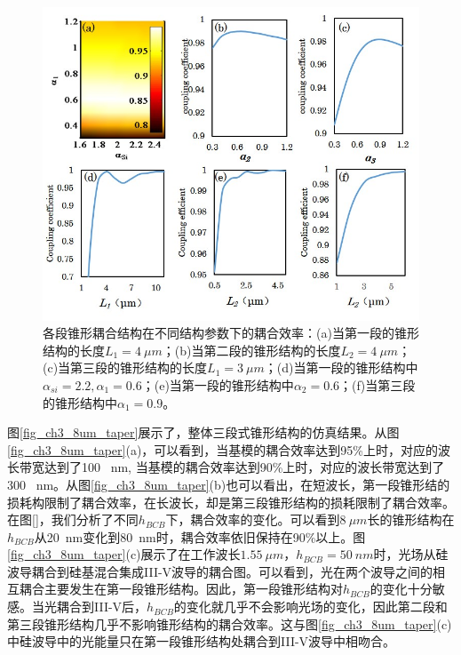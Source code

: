 \begin{figure}[htb]
	\centering
	\includegraphics[width=14cm]{./Pictures/fig_ch3_sweep_structure.jpg}
	\caption{各段锥形耦合结构在不同结构参数下的耦合效率：(a)当第一段的锥形结构的长度$L_1 = 4~\mu m$；(b)当第二段的锥形结构的长度$L_2 = 4~\mu m$；(c)当第三段的锥形结构的长度$L_1 = 3~\mu m$；(d)当第一段的锥形结构中$\alpha_{si}= 2.2, \alpha_1 = 0.6$；(e)当第一段的锥形结构中$\alpha_2 = 0.6$；(f)当第三段的锥形结构中$\alpha_1 = 0.9$。}
	\label{fig_ch3_sweep_structure}
\end{figure}

图\ref{fig_ch3_8um_taper}展示了，整体三段式锥形结构的仿真结果。从图\ref{fig_ch3_8um_taper}(a)，可以看到，当基模的耦合效率达到95\%上时，对应的波长带宽达到了100 ~nm, 当基模的耦合效率达到90\%上时，对应的波长带宽达到了300 ~nm。从图\ref{fig_ch3_8um_taper}(b)也可以看出，在短波长，第一段锥形结的损耗构限制了耦合效率，在长波长，却是第三段锥形结构的损耗限制了耦合效率。在图\ref{}，我们分析了不同$h_{BCB}$下，耦合效率的变化。可以看到$8 ~\mu m$长的锥形结构在$h_{BCB}$从20~nm变化到80~nm时，耦合效率依旧保持在90\%以上。图\ref{fig_ch3_8um_taper}(c)展示了在工作波长$1.55~\mu m$，$h_{BCB} =  50 ~nm$时，光场从硅波导耦合到硅基混合集成III-V波导的耦合图。可以看到，光在两个波导之间的相互耦合主要发生在第一段锥形结构。因此，第一段锥形结构对$h_{BCB}$的变化十分敏感。当光耦合到III-V后，$h_{BCB}$的变化就几乎不会影响光场的变化，因此第二段和第三段锥形结构几乎不影响锥形结构的耦合效率。这与图\ref{fig_ch3_8um_taper}(c)中硅波导中的光能量只在第一段锥形结构处耦合到III-V波导中相吻合。

